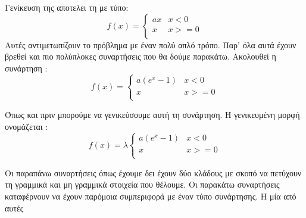 Γενίκευση της αποτελει τη  με τύπο:
\[f(x)=\left\{\begin{array}{ll}ax & x<0 \\ x & x>=0 \\ \end{array} \right.\]
Αυτές αντιμετωπίζουν το πρόβλημα με έναν πολύ απλό τρόπο. Παρ' όλα αυτά έχουν βρεθεί και πιο πολύπλοκες συναρτήσεις που θα δούμε παρακάτω. Ακολουθεί η συνάρτηση :
\[f(x)=\left\{\begin{array}{ll}a(e^x-1) & x<0 \\ x & x>=0 \\ \end{array} \right.\]
\begin{figure}[H]
    \centering
    \caption{}
\end{figure}
Όπως και πριν μπορούμε να γενικεύσουμε αυτή τη συνάρτηση. Η γενικευμένη μορφή ονομάζεται :
\[f(x)=\lambda\left\{\begin{array}{ll}a(e^x-1) & x<0 \\ x & x>=0 \\ \end{array} \right.\]
\begin{figure}[H]
    \centering
    \caption{}
\end{figure}
Οι παραπάνω συναρτήσεις όπως έχουμε δει έχουν δύο κλάδους με σκοπό να πετύχουν τη γραμμικά και μη γραμμικά στοιχεία που θέλουμε. Οι παρακάτω συναρτήσεις καταφέρνουν να έχουν παρόμοια συμπεριφορά με έναν τύπο συνάρτησης. Η μία από αυτές
